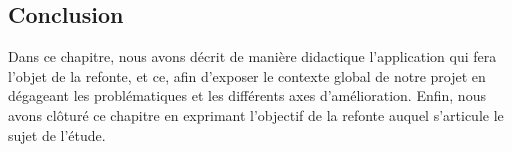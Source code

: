 \subsection*{Conclusion}
Dans ce chapitre, nous avons décrit de manière didactique l'application qui fera l'objet de la refonte, et ce, afin d'exposer le contexte global de notre projet en dégageant les problématiques et les différents axes d'amélioration. Enfin, nous avons clôturé ce chapitre en exprimant l'objectif de la refonte auquel s'articule le sujet de l'étude.
